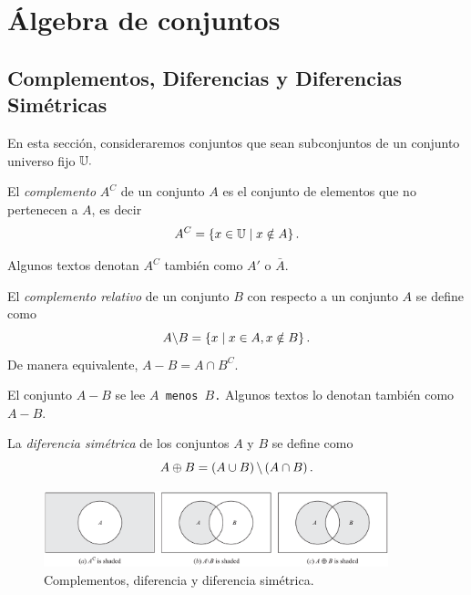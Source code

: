 \section{Álgebra de conjuntos}

%
%



\subsection{Complementos, Diferencias y Diferencias Sim\'etricas}


En esta sección, consideraremos conjuntos que sean subconjuntos de un conjunto universo fijo $\mathbb{U}.$



El \emph{complemento} $A^{C}$ de un conjunto $A$ es el conjunto de elementos que no pertenecen a $A$, es decir 
$$A^{C}=\left\{ x\in \mathbb{U} \mid x \notin A \right\}.$$



Algunos textos denotan $A^{C}$ tambi\'en como $A'$ o $\bar{A}.$ 



El \emph{complemento relativo} de un conjunto $B$ con respecto a un conjunto $A$ se define como 
$$
A\backslash B = \left\{ x \mid x \in A, x \notin B \right\}.
$$
De manera equivalente,	$A \minus B = A \cap B^{C}.$

El conjunto $A\minus B$ se lee \texttt{$A$ menos $B$.} Algunos textos lo denotan tambi\'en como $A-B.$  

La \emph{diferencia sim\'etrica} de los conjuntos $A$ y $B$ se define como $$A\oplus B=\left( A\cup B \right)\backslash \left( A \cap B \right).$$



\begin{figure}
	\centering
	\includegraphics[width=10cm,keepaspectratio=true]{./md/venn_complemento.png}
	\caption{Complementos, diferencia y diferencia simétrica.}
	\label{fig:0104}
\end{figure}






